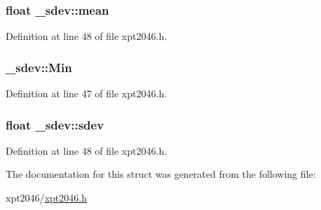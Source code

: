 \subsubsection[{\texorpdfstring{mean}{mean}}]{\setlength{\rightskip}{0pt plus 5cm}float \+\_\+sdev\+::mean}\hypertarget{struct__sdev_a2bd0cf80fd334fabaac9100a2538bcb5}{}\label{struct__sdev_a2bd0cf80fd334fabaac9100a2538bcb5}


Definition at line 48 of file xpt2046.\+h.

\subsubsection[{\texorpdfstring{Min}{Min}}]{ \+\_\+sdev\+::\+Min}\hypertarget{struct__sdev_ad496630f4d9975834148dcff8e2475c6}{}\label{struct__sdev_ad496630f4d9975834148dcff8e2475c6}


Definition at line 47 of file xpt2046.\+h.

\subsubsection[{\texorpdfstring{sdev}{sdev}}]{\setlength{\rightskip}{0pt plus 5cm}float \+\_\+sdev\+::sdev}\hypertarget{struct__sdev_a053a14f9e4bd729ce23aafdb1e69e48a}{}\label{struct__sdev_a053a14f9e4bd729ce23aafdb1e69e48a}


Definition at line 48 of file xpt2046.\+h.



The documentation for this struct was generated from the following file\+:\begin{DoxyCompactItemize}
\item 
xpt2046/\hyperlink{xpt2046_8h}{xpt2046.\+h}\end{DoxyCompactItemize}
